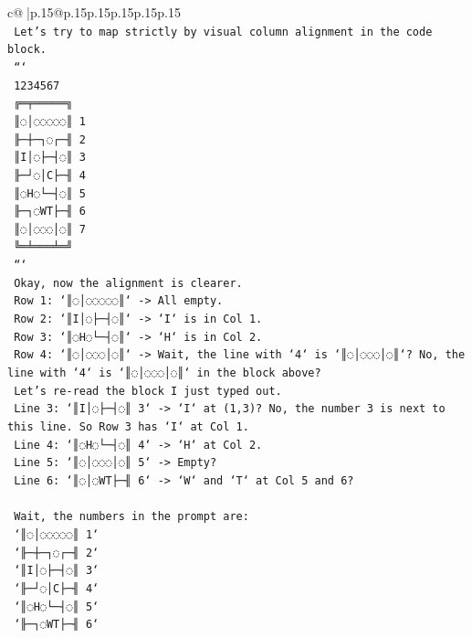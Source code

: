\documentclass{article}
\begin{document}
{\begin{supertabular}{c@{$\;$}|p{.15\linewidth}@{}p{.15\linewidth}p{.15\linewidth}p{.15\linewidth}p{.15\linewidth}p{.15\linewidth}}
{{{\\ 
\texttt{   Let's try to map strictly by visual column alignment in the code block.} \\
\texttt{   ```} \\
\texttt{    1234567} \\
\texttt{   ╔═╤═════╗} \\
\texttt{   ║◌│◌◌◌◌◌║ 1} \\
\texttt{   ╟─┼─┐◌┌─╢ 2} \\
\texttt{   ║I│◌├─┤◌║ 3} \\
\texttt{   ╟─┘◌│C├─╢ 4} \\
\texttt{   ║◌H◌└─┤◌║ 5} \\
\texttt{   ╟─┐◌WT├─╢ 6} \\
\texttt{   ║◌│◌◌◌│◌║ 7} \\
\texttt{   ╚═╧═══╧═╝} \\
\texttt{   ```} \\
\texttt{   Okay, now the alignment is clearer.} \\
\texttt{   Row 1: `║◌│◌◌◌◌◌║` {-}> All empty.} \\
\texttt{   Row 2: `║I│◌├─┤◌║` {-}> `I` is in Col 1.} \\
\texttt{   Row 3: `║◌H◌└─┤◌║` {-}> `H` is in Col 2.} \\
\texttt{   Row 4: `║◌│◌◌◌│◌║` {-}> Wait, the line with `4` is `║◌│◌◌◌│◌║`? No, the line with `4` is `║◌│◌◌◌│◌║` in the block above?} \\
\texttt{   Let's re{-}read the block I just typed out.} \\
\texttt{   Line 3: `║I│◌├─┤◌║ 3` {-}> `I` at (1,3)? No, the number 3 is next to this line. So Row 3 has `I` at Col 1.} \\
\texttt{   Line 4: `║◌H◌└─┤◌║ 4` {-}> `H` at Col 2.} \\
\texttt{   Line 5: `║◌│◌◌◌│◌║ 5` {-}> Empty?} \\
\texttt{   Line 6: `║◌│◌WT├─╢ 6` {-}> `W` and `T` at Col 5 and 6?} \\
\\ 
\texttt{   Wait, the numbers in the prompt are:} \\
\texttt{   `║◌│◌◌◌◌◌║ 1`} \\
\texttt{   `╟─┼─┐◌┌─╢ 2`} \\
\texttt{   `║I│◌├─┤◌║ 3`} \\
\texttt{   `╟─┘◌│C├─╢ 4`} \\
\texttt{   `║◌H◌└─┤◌║ 5`} \\
\texttt{   `╟─┐◌WT├─╢ 6`} \\
}}}
\end{supertabular}}
\end{document}
